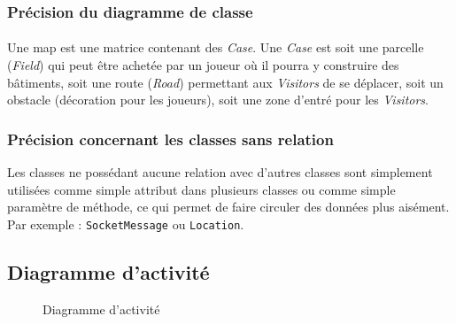 \documentclass[a4paper,11pt]{report}
\begin{document}
\subsubsection{Précision du diagramme de classe}
\paragraph{}
Une map est une matrice contenant des \textit{Case}. Une \textit{Case} est soit une parcelle (\textit{Field}) qui peut être achetée par un joueur où il pourra y construire des bâtiments, soit une route (\textit{Road}) permettant aux \textit{Visitors} de se déplacer, soit un obstacle (décoration  pour les joueurs), soit une zone d'entré pour les \textit{Visitors}. 
\subsubsection{Précision concernant les classes sans relation}
Les classes ne possédant aucune relation avec d'autres classes sont simplement utilisées comme simple attribut dans plusieurs classes ou comme 
simple paramètre de méthode, ce qui permet de faire circuler des données plus aisément. Par exemple : \texttt{SocketMessage} ou \texttt{Location}.
\subsection{Diagramme d'activité}
\begin{figure}[ht]
    \caption{Diagramme d'activité}
\end{figure}
\end{document}
